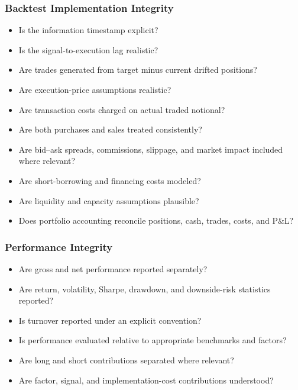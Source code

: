 \documentclass[11pt,a4paper]{article}
\begin{document}
\subsubsection{Backtest Implementation Integrity}

\begin{itemize}
    \item[$\square$] Is the information timestamp explicit?
    \item[$\square$] Is the signal-to-execution lag realistic?
    \item[$\square$] Are trades generated from target minus current drifted
    positions?
    \item[$\square$] Are execution-price assumptions realistic?
    \item[$\square$] Are transaction costs charged on actual traded notional?
    \item[$\square$] Are both purchases and sales treated consistently?
    \item[$\square$] Are bid--ask spreads, commissions, slippage, and market
    impact included where relevant?
    \item[$\square$] Are short-borrowing and financing costs modeled?
    \item[$\square$] Are liquidity and capacity assumptions plausible?
    \item[$\square$] Does portfolio accounting reconcile positions, cash, trades,
    costs, and P\&L?
\end{itemize}


\subsubsection{Performance Integrity}

\begin{itemize}
    \item[$\square$] Are gross and net performance reported separately?
    \item[$\square$] Are return, volatility, Sharpe, drawdown, and downside-risk
    statistics reported?
    \item[$\square$] Is turnover reported under an explicit convention?
    \item[$\square$] Is performance evaluated relative to appropriate benchmarks
    and factors?
    \item[$\square$] Are long and short contributions separated where relevant?
    \item[$\square$] Are factor, signal, and implementation-cost contributions
    understood?
\end{itemize}
\end{document}
